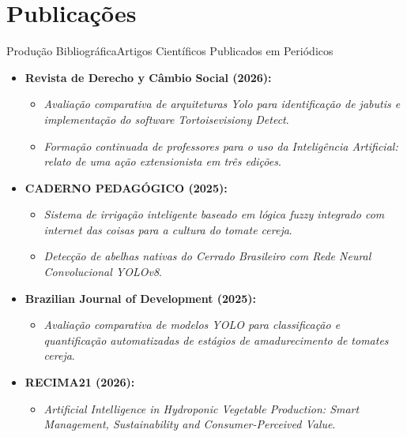 \documentclass[9pt]{beamer}
\begin{document}
\section{Publicações}
\begin{frame}{Produção Bibliográfica}{Artigos Científicos Publicados em Periódicos}
  \begin{itemize}
    \item \textbf{Revista de Derecho y Câmbio Social (2026):}
      \begin{itemize}
        \item \textit{Avaliação comparativa de arquiteturas Yolo para identificação de jabutis e implementação do software Tortoisevisiony Detect}.
        \item \textit{Formação continuada de professores para o uso da Inteligência Artificial: relato de uma ação extensionista em três edições}.
      \end{itemize}
    \vspace{0.15cm}
    \item \textbf{CADERNO PEDAGÓGICO (2025):}
      \begin{itemize}
        \item \textit{Sistema de irrigação inteligente baseado em lógica fuzzy integrado com internet das coisas para a cultura do tomate cereja}.
        \item \textit{Detecção de abelhas nativas do Cerrado Brasileiro com Rede Neural Convolucional YOLOv8}.
      \end{itemize}
    \vspace{0.15cm}
    \item \textbf{Brazilian Journal of Development (2025):}
      \begin{itemize}
        \item \textit{Avaliação comparativa de modelos YOLO para classificação e quantificação automatizadas de estágios de amadurecimento de tomates cereja}.
      \end{itemize}
    \vspace{0.15cm}
    \item \textbf{RECIMA21 (2026):}
      \begin{itemize}
        \item \textit{Artificial Intelligence in Hydroponic Vegetable Production: Smart Management, Sustainability and Consumer-Perceived Value}.
      \end{itemize}
  \end{itemize}
\end{frame}
\end{document}
